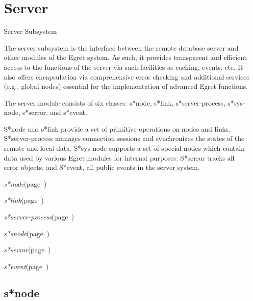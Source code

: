\chapter{Server}
\label{Server}

\begin{description}
\item [Name:]  Server Subsystem

\item [Description:]
The server subsystem is the interface between the remote
database server and other modules of the Egret system. As
such, it provides transparent and efficient access to the
functions of the server via such facilities as caching,
events, etc. It also offers encapsulation via
comprehensive error checking and additional services
(e.g., global nodes) essential for the implementation of
advanced Egret functions.

The server module consists of six classes: s*node, s*link,
s*server-process, s*sys-node, s*serror, and s*event.

S*node and s*link provide a set of primitive operations
on nodes and links.  S*server-process manages connection
sessions and synchronizes the states of the remote and
local data.  S*sys-node supports a set of special nodes
which contain data used by various Egret modules for
internal purposes.  S*serror tracks all error objects,
and S*event, all public events in the server system.

\item [Public-classes:]
\item {\sl s*node}\hfill(page~\pageref{s*node})
\item {\sl s*link}\hfill(page~\pageref{s*link})
\item {\sl s*server-process}\hfill(page~\pageref{s*server-process})
\item {\sl s*snode}\hfill(page~\pageref{s*snode})
\item {\sl s*serror}\hfill(page~\pageref{s*serror})
\item {\sl s*event}\hfill(page~\pageref{s*event})  

\item [Private-classes:]




\end{description}
\horizontalline

\section{s*node}
\label{s*node}

